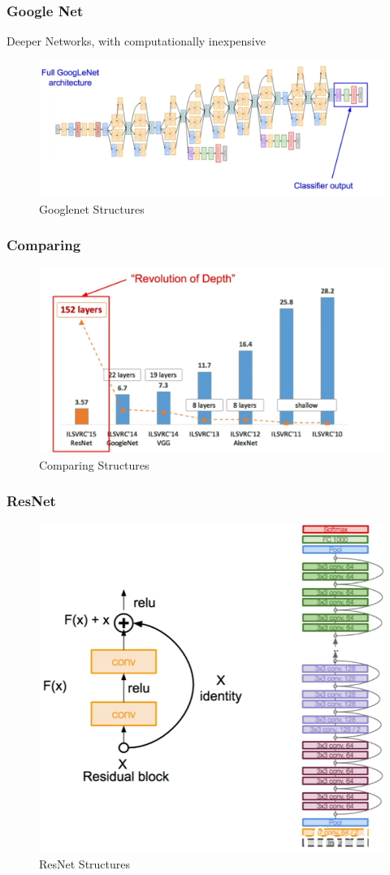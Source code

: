 \documentclass{beamer}
\begin{document}
\begin{frame}
\frametitle{Google Net}
{\color{red} Deeper Networks, with computationally inexpensive}
\begin{figure}
	\includegraphics[width=\linewidth]{Pics/googlenet.png}
     \caption{Googlenet Structures}
\end{figure}
\end{frame}
\begin{frame}
\frametitle{Comparing}

\begin{figure}
	\includegraphics[width=\linewidth]{Pics/com3.png}
	\caption{Comparing Structures}
\end{figure}

\end{frame}
\begin{frame}
\frametitle{ResNet}

\begin{figure}
	\includegraphics[width=.6\linewidth]{Pics/resnet.png}
	\caption{ResNet Structures}
\end{figure}

\end{frame}
\end{document}
